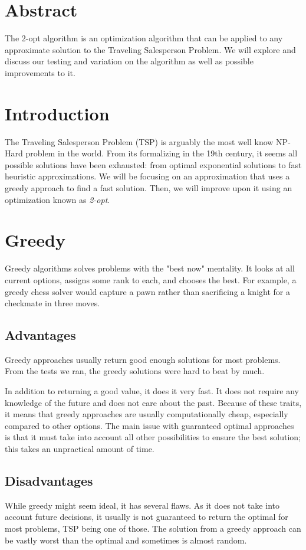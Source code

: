 \documentclass[12pt]{report}
\begin{document}
\begin{multicols}{2}

    \section*{Abstract}
    The 2-opt algorithm is an optimization algorithm that can be applied to any approximate solution to the Traveling Salesperson Problem. We will explore and discuss our testing and variation on the algorithm as well as possible improvements to it.
    \section{Introduction}
    The Traveling Salesperson Problem (TSP) is arguably the most well know NP-Hard problem in the world. From its formalizing in the 19th century, it seems all possible solutions have been exhausted: from optimal exponential solutions to fast heuristic approximations. We will be focusing on an approximation that uses a greedy approach to find a fast solution. Then, we will improve upon it using an optimization known as \textit{2-opt}.

    \section{Greedy}
    Greedy algorithms solves problems with the "best now" mentality. It looks at all current options, assigns some rank to each, and chooses the best. For example, a greedy chess solver would capture a pawn rather than sacrificing a knight for a checkmate in three moves.
    \subsection{Advantages}
    Greedy approaches usually return good enough solutions for most problems. From the tests we ran, the greedy solutions were hard to beat by much. 

    In addition to returning a good value, it does it very fast. It does not require any knowledge of the future and does not care about the past. Because of these traits, it means that greedy approaches are usually computationally cheap, especially compared to other options. The main issue with guaranteed optimal approaches is that it must take into account all other possibilities to ensure the best solution; this takes an unpractical amount of time.
    \subsection{Disadvantages}
    While greedy might seem ideal, it has several flaws. As it does not take into account future decisions, it usually is not guaranteed to return the optimal for most problems, TSP being one of those. The solution from a greedy approach can be vastly worst than the optimal and sometimes is almost random. 
\end{multicols}
\end{document}
